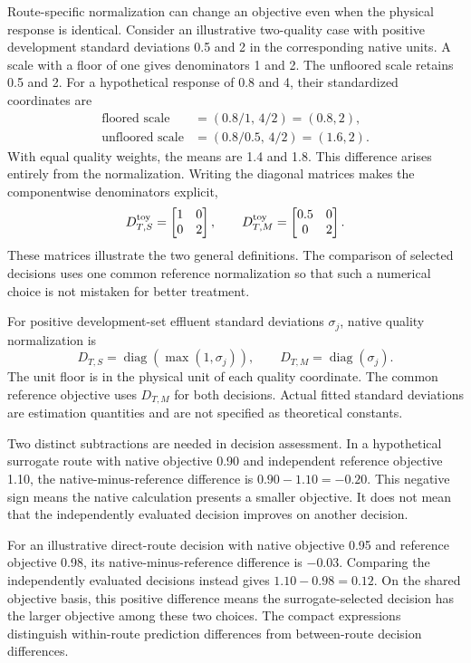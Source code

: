 Route-specific normalization can change an objective even when the physical response is identical. Consider an illustrative two-quality case with positive development standard deviations 0.5 and 2 in the corresponding native units. A scale with a floor of one gives denominators 1 and 2. The unfloored scale retains 0.5 and 2. For a hypothetical response of 0.8 and 4, their standardized coordinates are
\[
\begin{aligned}
\text{floored scale}&=(0.8/1,\,4/2)=(0.8,2),\\
\text{unfloored scale}&=(0.8/0.5,\,4/2)=(1.6,2).
\end{aligned}
\]
With equal quality weights, the means are 1.4 and 1.8. This difference arises entirely from the normalization. Writing the diagonal matrices makes the componentwise denominators explicit,
\[
D_{T,S}^{\rm toy}=\begin{bmatrix}1&0\\0&2\end{bmatrix},\qquad
D_{T,M}^{\rm toy}=\begin{bmatrix}0.5&0\\0&2\end{bmatrix}.
\]
These matrices illustrate the two general definitions. The comparison of selected decisions uses one common reference normalization so that such a numerical choice is not mistaken for better treatment.

For positive development-set effluent standard deviations $\sigma_j$, native quality normalization is
\begin{equation}
D_{T,S}=\operatorname{diag}(\max(1,\sigma_j)),\qquad
D_{T,M}=\operatorname{diag}(\sigma_j).
\label{eq:plant_route_normalization}
\end{equation}
The unit floor is in the physical unit of each quality coordinate. The common reference objective uses $D_{T,M}$ for both decisions. Actual fitted standard deviations are estimation quantities and are not specified as theoretical constants.

Two distinct subtractions are needed in decision assessment. In a hypothetical surrogate route with native objective 0.90 and independent reference objective 1.10, the native-minus-reference difference is $0.90-1.10=-0.20$. This negative sign means the native calculation presents a smaller objective. It does not mean that the independently evaluated decision improves on another decision.

For an illustrative direct-route decision with native objective 0.95 and reference objective 0.98, its native-minus-reference difference is $-0.03$. Comparing the independently evaluated decisions instead gives $1.10-0.98=0.12$. On the shared objective basis, this positive difference means the surrogate-selected decision has the larger objective among these two choices. The compact expressions distinguish within-route prediction differences from between-route decision differences.


